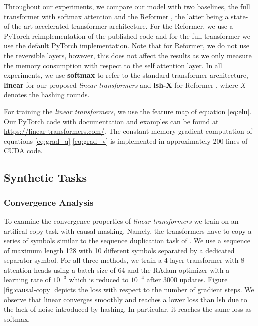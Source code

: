 Throughout our experiments, we compare our model with two baselines, the full transformer with softmax attention and the Reformer \cite{kitaev2020reformer}, the latter being a state-of-the-art accelerated transformer architecture. For the Reformer, we use a PyTorch reimplementation of the published code and for the full transformer we use the default PyTorch implementation. Note that for Reformer, we do not use the reversible layers, however, this does not affect the results as we only measure the memory consumption with respect to the self attention layer. In all experiments, we use
\textbf{softmax} \cite{vaswani_attn} to refer to the standard transformer architecture, \textbf{linear} for our proposed \emph{linear transformers} and
\textbf{lsh-X} for Reformer \cite{kitaev2020reformer}, where \emph{X} denotes the hashing rounds.

For training the \emph{linear transformers}, we use the feature map of equation
\ref{eq:elu}. Our PyTorch \cite{paszke2019pytorch} code with documentation and examples can be found at \url{https://linear-transformers.com/}. The constant memory gradient computation of equations \ref{eq:grad_q}-\ref{eq:grad_v} is implemented in approximately 200 lines of CUDA code.

\subsection{Synthetic Tasks} \label{sec:synthetic}

\subsubsection{Convergence Analysis}

To examine the convergence properties of \emph{linear transformers} we train on an artifical copy task with causal masking. Namely, the transformers have to copy a series of symbols similar to the sequence duplication task of \citet{kitaev2020reformer}. We use a sequence of maximum length 128 with 10 different symbols separated by a dedicated separator symbol. For all three methods, we train a 4 layer transformer with 8 attention heads using a batch size of 64 and the RAdam optimizer \cite{liu2019variance} with a learning rate of $10^{-3}$ which is reduced to $10^{-4}$ after 3000 updates. Figure \ref{fig:causal-copy} depicts the loss with respect to the number of gradient steps. We observe that linear converges smoothly and reaches a lower loss than lsh due to the lack of noise introduced by hashing. In particular, it reaches the same loss as softmax.

